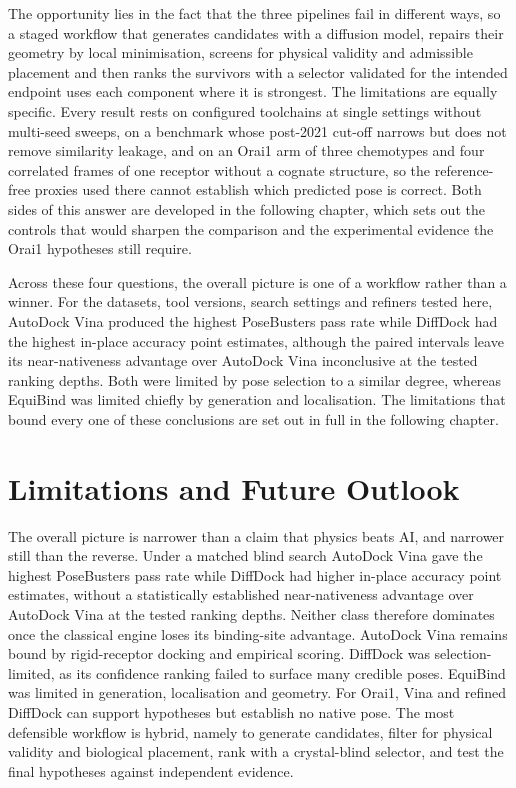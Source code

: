 The opportunity lies in the fact that the three pipelines fail in different ways, so a staged workflow that generates candidates with a diffusion model, repairs their geometry by local minimisation, screens for physical validity and admissible placement and then ranks the survivors with a selector validated for the intended endpoint uses each component where it is strongest. The limitations are equally specific. Every result rests on configured toolchains at single settings without multi-seed sweeps, on a benchmark whose post-2021 cut-off narrows but does not remove similarity leakage, and on an Orai1 arm of three chemotypes and four correlated frames of one receptor without a cognate structure, so the reference-free proxies used there cannot establish which predicted pose is correct. Both sides of this answer are developed in the following chapter, which sets out the controls that would sharpen the comparison and the experimental evidence the Orai1 hypotheses still require.

Across these four questions, the overall picture is one of a workflow rather than a winner. For the datasets, tool versions, search settings and refiners tested here, AutoDock Vina produced the highest PoseBusters pass rate while DiffDock had the highest in-place accuracy point estimates, although the paired intervals leave its near-nativeness advantage over AutoDock Vina inconclusive at the tested ranking depths. Both were limited by pose selection to a similar degree, whereas EquiBind was limited chiefly by generation and localisation. The limitations that bound every one of these conclusions are set out in full in the following chapter.

\hypertarget{limitations-and-future-outlook}{%
\chapter{Limitations and Future Outlook}\label{limitations-and-future-outlook}}

The overall picture is narrower than a claim that physics beats AI, and narrower still than the reverse. Under a matched blind search AutoDock Vina gave the highest PoseBusters pass rate while DiffDock had higher in-place accuracy point estimates, without a statistically established near-nativeness advantage over AutoDock Vina at the tested ranking depths. Neither class therefore dominates once the classical engine loses its binding-site advantage. AutoDock Vina remains bound by rigid-receptor docking and empirical scoring. DiffDock was selection-limited, as its confidence ranking failed to surface many credible poses. EquiBind was limited in generation, localisation and geometry. For Orai1, Vina and refined DiffDock can support hypotheses but establish no native pose. The most defensible workflow is hybrid, namely to generate candidates, filter for physical validity and biological placement, rank with a crystal-blind selector, and test the final hypotheses against independent evidence.

